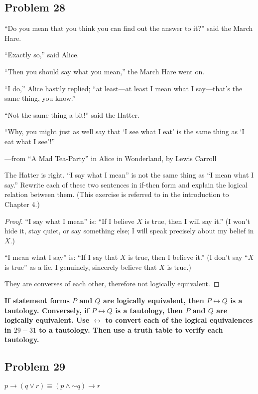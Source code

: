 \documentclass[14pt]{extarticle}
\newcommand{\bic}{\leftrightarrow}
\begin{document}
\subsection{Problem 28}
“Do you mean that you think you can find out the answer to it?” said the March Hare.

“Exactly so,” said Alice.

“Then you should say what you mean,” the March Hare went on.

“I do,” Alice hastily replied; “at least—at least I mean what I say—that’s the same thing, you know.”

“Not the same thing a bit!” said the Hatter.

“Why, you might just as well say that ‘I see what I eat’ is the same thing as ‘I eat what I see’!”

—from “A Mad Tea-Party” in Alice in Wonderland, by Lewis Carroll

The Hatter is right. “I say what I mean” is not the same thing as “I mean what I say.” Rewrite each of these two sentences in if-then form and explain the logical relation between them. (This exercise is referred to in the introduction to Chapter 4.)

\begin{proof}
“I say what I mean” is: ``If I believe $X$ is true, then I will say it.'' (I won't hide it, stay quiet, or say something else; I will speak precisely about my belief in $X$.)

“I mean what I say” is: ``If I say that $X$ is true, then I believe it.'' (I don't say ``$X$ is true'' as a lie. I genuinely, sincerely believe that $X$ is true.)

They are converses of each other, therefore not logically equivalent.
\end{proof}

{\bf If statement forms $P$ and $Q$ are logically equivalent, then $P \bic Q$ is a tautology. Conversely, if $P \bic Q$ is a tautology, then $P$ and $Q$ are logically equivalent. Use $\bic$ to convert each of the logical equivalences in $29-31$ to a tautology. Then use a truth table to verify each tautology.}

\subsection{Problem 29}
$p \to (q \vee r) \equiv (p \wedge {\sim q}) \to r$
\end{document}
